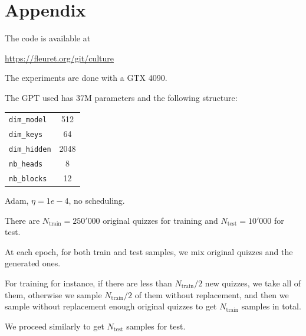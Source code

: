 \documentclass[11pt,a4paper,oneside]{article}
\begin{document}
\section*{Appendix}

The code is available at

\medskip

\centerline{\url{https://fleuret.org/git/culture}}

The experiments are done with a GTX 4090.

The GPT used has 37M parameters and the following structure:

\begin{center}
\begin{tabular}{lc}
    \texttt{dim\_model}  & 512  \\
    \texttt{dim\_keys}   & 64   \\
    \texttt{dim\_hidden} & 2048 \\
    \texttt{nb\_heads}   & 8    \\
    \texttt{nb\_blocks}  & 12
\end{tabular}
\end{center}

Adam, $\eta = 1e-4$, no scheduling.

There are $N_{\text{train}}=250'000$ original quizzes for training and
$N_{\text{test}} = 10'000$ for test.

At each epoch, for both train and test samples, we mix original
quizzes and the generated ones.

For training for instance, if there are less than $N_{\text{train}}/2$
new quizzes, we take all of them, otherwise we sample
$N_{\text{train}}/2$ of them without replacement, and then we sample
without replacement enough original quizzes to get $N_{\text{train}}$
samples in total.

We proceed similarly to get $N_{\text{test}}$ samples for test.
\end{document}
